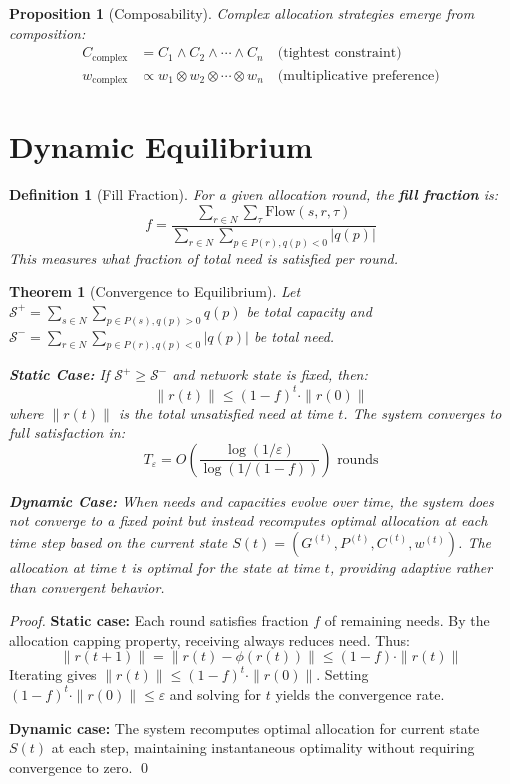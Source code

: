 \documentclass[11pt]{article}
\newtheorem{definition}{Definition}
\newtheorem{theorem}{Theorem}
\newtheorem{proposition}{Proposition}
\begin{document}
\begin{proposition}[Composability]
Complex allocation strategies emerge from composition:
\begin{align}
C_{\text{complex}} &= C_1 \wedge C_2 \wedge \cdots \wedge C_n \quad \text{(tightest constraint)} \\
w_{\text{complex}} &\propto w_1 \otimes w_2 \otimes \cdots \otimes w_n \quad \text{(multiplicative preference)}
\end{align}
\end{proposition}

\section{Dynamic Equilibrium}

\begin{definition}[Fill Fraction]
For a given allocation round, the \textbf{fill fraction} is:
\[
f = \frac{\sum_{r \in N} \sum_{\tau} \text{Flow}(s, r, \tau)}{\sum_{r \in N} \sum_{p \in P(r), q(p) < 0} |q(p)|}
\]
This measures what fraction of total need is satisfied per round.
\end{definition}

\begin{theorem}[Convergence to Equilibrium]
Let $\mathcal{S}^+ = \sum_{s \in N} \sum_{p \in P(s), q(p) > 0} q(p)$ be total capacity and $\mathcal{S}^- = \sum_{r \in N} \sum_{p \in P(r), q(p) < 0} |q(p)|$ be total need.

\textbf{Static Case:} If $\mathcal{S}^+ \geq \mathcal{S}^-$ and network state is fixed, then:
\[
\|r(t)\| \leq (1-f)^t \cdot \|r(0)\|
\]
where $\|r(t)\|$ is the total unsatisfied need at time $t$. The system converges to full satisfaction in:
\[
T_\varepsilon = O\left(\frac{\log(1/\varepsilon)}{\log(1/(1-f))}\right) \text{ rounds}
\]

\textbf{Dynamic Case:} When needs and capacities evolve over time, the system does not converge to a fixed point but instead recomputes optimal allocation at each time step based on the current state $S(t) = (G^{(t)}, P^{(t)}, C^{(t)}, w^{(t)})$. The allocation at time $t$ is optimal for the state at time $t$, providing adaptive rather than convergent behavior.
\end{theorem}

\begin{proof}
\textbf{Static case:} Each round satisfies fraction $f$ of remaining needs. By the allocation capping property, receiving always reduces need. Thus:
\[
\|r(t+1)\| = \|r(t) - \phi(r(t))\| \leq (1-f) \cdot \|r(t)\|
\]
Iterating gives $\|r(t)\| \leq (1-f)^t \cdot \|r(0)\|$. Setting $(1-f)^t \cdot \|r(0)\| \leq \varepsilon$ and solving for $t$ yields the convergence rate.

\textbf{Dynamic case:} The system recomputes optimal allocation for current state $S(t)$ at each step, maintaining instantaneous optimality without requiring convergence to zero. \qed
\end{proof}
\end{document}
